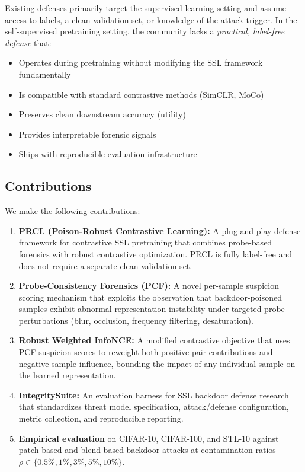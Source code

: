 \documentclass[11pt,a4paper]{article}
\begin{document}
Existing defenses primarily target the supervised learning setting and assume
access to labels, a clean validation set, or knowledge of the attack trigger.
In the self-supervised pretraining setting, the community lacks a
\emph{practical, label-free defense} that:
\begin{itemize}[nosep]
  \item Operates during pretraining without modifying the SSL framework fundamentally
  \item Is compatible with standard contrastive methods (SimCLR, MoCo)
  \item Preserves clean downstream accuracy (utility)
  \item Provides interpretable forensic signals
  \item Ships with reproducible evaluation infrastructure
\end{itemize}

\subsection{Contributions}

We make the following contributions:

\begin{enumerate}
  \item \textbf{PRCL (Poison-Robust Contrastive Learning):} A plug-and-play
    defense framework for contrastive SSL pretraining that combines probe-based
    forensics with robust contrastive optimization.  PRCL is fully label-free
    and does not require a separate clean validation set.

  \item \textbf{Probe-Consistency Forensics (PCF):} A novel per-sample suspicion
    scoring mechanism that exploits the observation that backdoor-poisoned
    samples exhibit abnormal representation instability under targeted probe
    perturbations (blur, occlusion, frequency filtering, desaturation).

  \item \textbf{Robust Weighted InfoNCE:} A modified contrastive objective that
    uses PCF suspicion scores to reweight both positive pair contributions and
    negative sample influence, bounding the impact of any individual sample on
    the learned representation.

  \item \textbf{IntegritySuite:} An evaluation harness for SSL backdoor defense
    research that standardizes threat model specification, attack/defense
    configuration, metric collection, and reproducible reporting.

  \item \textbf{Empirical evaluation} on CIFAR-10, CIFAR-100, and STL-10 against
    patch-based and blend-based backdoor attacks at contamination ratios
    $\rho\in\{0.5\%,1\%,3\%,5\%,10\%\}$.
\end{enumerate}
\end{document}
